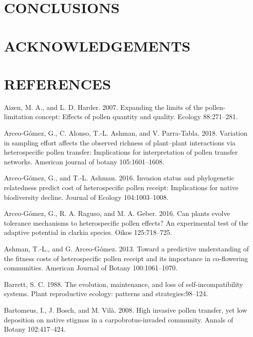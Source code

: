 \documentclass[11pt,a4paper]{article}
\begin{document}
\section{CONCLUSIONS}\label{conclusions}

\section{ACKNOWLEDGEMENTS}\label{acknowledgements}

\section{REFERENCES}\label{references}

\hypertarget{refs}{}
\hypertarget{ref-aizen2007}{}
Aizen, M. A., and L. D. Harder. 2007. Expanding the limits of the
pollen-limitation concept: Effects of pollen quantity and quality.
Ecology 88:271--281.

\hypertarget{ref-arceo2018}{}
Arceo-Gómez, G., C. Alonso, T.-L. Ashman, and V. Parra-Tabla. 2018.
Variation in sampling effort affects the observed richness of
plant--plant interactions via heterospecific pollen transfer:
Implications for interpretation of pollen transfer networks. American
journal of botany 105:1601--1608.

\hypertarget{ref-arceo2016}{}
Arceo-Gómez, G., and T.-L. Ashman. 2016. Invasion status and
phylogenetic relatedness predict cost of heterospecific pollen receipt:
Implications for native biodiversity decline. Journal of Ecology
104:1003--1008.

\hypertarget{ref-arceo2016can}{}
Arceo-Gómez, G., R. A. Raguso, and M. A. Geber. 2016. Can plants evolve
tolerance mechanisms to heterospecific pollen effects? An experimental
test of the adaptive potential in clarkia species. Oikos 125:718--725.

\hypertarget{ref-ashman2013}{}
Ashman, T.-L., and G. Arceo-Gómez. 2013. Toward a predictive
understanding of the fitness costs of heterospecific pollen receipt and
its importance in co-flowering communities. American Journal of Botany
100:1061--1070.

\hypertarget{ref-barrett1988}{}
Barrett, S. C. 1988. The evolution, maintenance, and loss of
self-incompatibility systems. Plant reproductive ecology: patterns and
strategies:98--124.

\hypertarget{ref-bartomeus2008}{}
Bartomeus, I., J. Bosch, and M. Vilà. 2008. High invasive pollen
transfer, yet low deposition on native stigmas in a carpobrotus-invaded
community. Annals of Botany 102:417--424.
\end{document}
